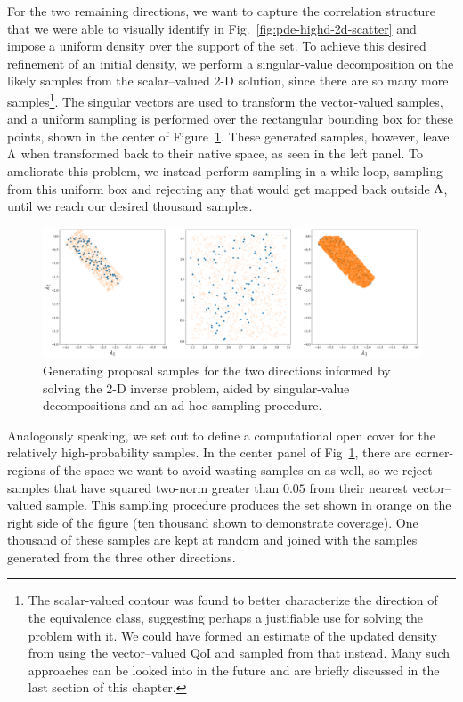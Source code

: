 For the two remaining directions, we want to capture the correlation structure that we were able to visually identify in Fig.~\ref{fig:pde-highd-2d-scatter} and impose a uniform density over the support of the set.
To achieve this desired refinement of an initial density, we perform a singular-value decomposition on the likely samples from the scalar--valued 2-D solution, since there are so many more samples\footnote{ The scalar-valued contour was found to better characterize the direction of the equivalence class, suggesting perhaps a justifiable use for solving the problem with it. We could have formed an estimate of the updated density from using the vector--valued QoI and sampled from that instead. Many such approaches can be looked into in the future and are briefly discussed in the last section of this chapter.}.
The singular vectors are used to transform the vector-valued samples, and a uniform sampling is performed over the rectangular bounding box for these points, shown in the center of Figure~\ref{fig:pde-highd-2d-study}.
These generated samples, however, leave ${\Lambda}$ when transformed back to their native space, as seen in the left panel.
To ameliorate this problem, we instead perform sampling in a while-loop, sampling from this uniform box and rejecting any that would get mapped back outside ${\Lambda}$, until we reach our desired thousand samples.


\begin{figure}[htbp]
\centering
  \includegraphics[width=0.95\linewidth]{figures/pde-highd/pde-highd-alt_initial_D2_m100}
\caption{
Generating proposal samples for the two directions informed by solving the 2-D inverse problem, aided by singular-value decompositions and an ad-hoc sampling procedure.
}
\label{fig:pde-highd-2d-study}
\end{figure}

Analogously speaking, we set out to define a computational open cover for the relatively high-probability samples.
In the center panel of Fig~\ref{fig:pde-highd-2d-study}, there are corner-regions of the space we want to avoid wasting samples on as well, so we reject samples that have squared two-norm greater than $0.05$ from their nearest vector--valued sample.
This sampling procedure produces the set shown in orange on the right side of the figure (ten thousand shown to demonstrate coverage).
One thousand of these samples are kept at random and joined with the samples generated from the three other directions.
